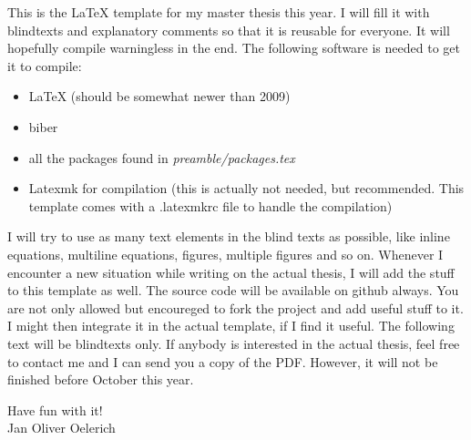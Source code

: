 \label{cha:introduction}

This is the \LaTeX{} template for my master thesis this year. I will fill
it with blindtexts and explanatory comments so that it is reusable for
everyone. It will hopefully compile warningless in the end. The following
software is needed to get it to compile:
\begin{itemize}
  \item LaTeX (should be somewhat newer than 2009)
  \item biber
  \item all the packages found in \emph{preamble/packages.tex}
  \item Latexmk for compilation (this is actually not needed, but
  recommended. This template comes with a .latexmkrc file to handle the
  compilation) 
\end{itemize}
I will try to use as many text elements in the blind texts as possible,
like inline equations, multiline equations, figures, multiple figures and
so on. Whenever I encounter a new situation while writing on the actual
thesis, I will add the stuff to this template as well.
The source code will be available on github always. You are not only
allowed but encoureged to fork the project and add useful stuff to it. I
might then integrate it in the actual template, if I find it useful.
The following text will be blindtexts only. If anybody is interested in the
actual thesis, feel free to contact me and I can send you a copy of the
PDF. However, it will not be finished before October this year.

\vspace{.5cm}

Have fun with it! \\
Jan Oliver Oelerich
